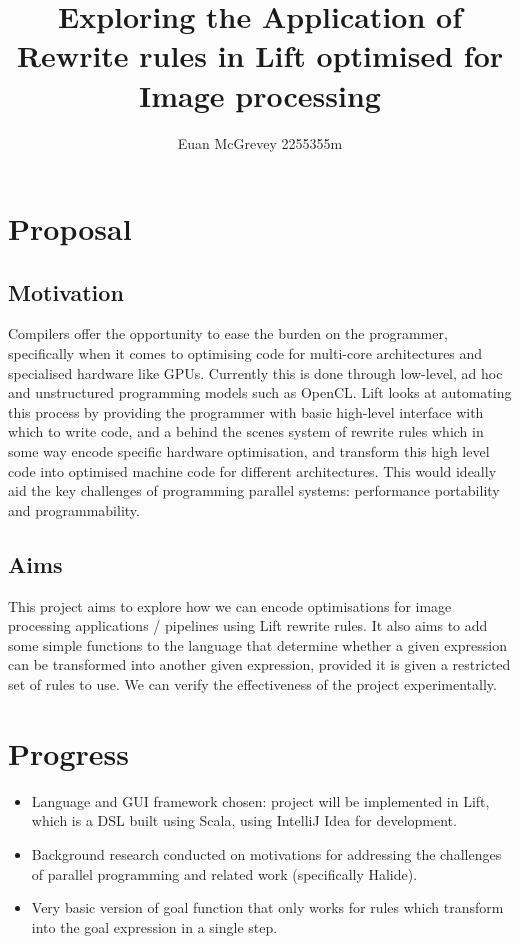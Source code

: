 \documentclass[11pt]{article}
\title{Exploring the Application of Rewrite rules in Lift optimised for Image processing}
\author{Euan McGrevey 2255355m}
\begin{document}
    \maketitle
    
    
     



\section{Proposal}\label{proposal}

\subsection{Motivation}\label{motivation}

Compilers offer the opportunity to ease the burden on the programmer, specifically when it comes to optimising code for multi-core architectures and specialised hardware like GPUs. Currently this is done through low-level, ad hoc and unstructured programming models such as OpenCL. Lift looks at automating this process by providing the programmer with basic high-level interface with which to write code, and a behind the scenes system of rewrite rules which in some way encode specific hardware optimisation, and transform this high level code into optimised machine code for different architectures. This would ideally aid the key challenges of programming parallel systems: performance portability and programmability.

\subsection{Aims}\label{aims}

This project aims to explore how we can encode optimisations for image processing applications  / pipelines using Lift rewrite rules.
It also aims to add some simple functions to the language that determine whether a given expression can be transformed into another given expression, provided it is given a restricted set of rules to use.
We can verify the effectiveness of the project experimentally.

\section{Progress}\label{progress}

\begin{itemize}
    \tightlist
\item  Language and GUI framework chosen: project will be implemented in Lift, which is a DSL built using Scala, using IntelliJ Idea for development.
\item  Background research conducted on motivations for addressing the challenges of parallel programming and related work (specifically Halide).
\item  Very basic version of goal function that only works for rules which transform into the goal expression in a single step.
\end{itemize}
\end{document}
